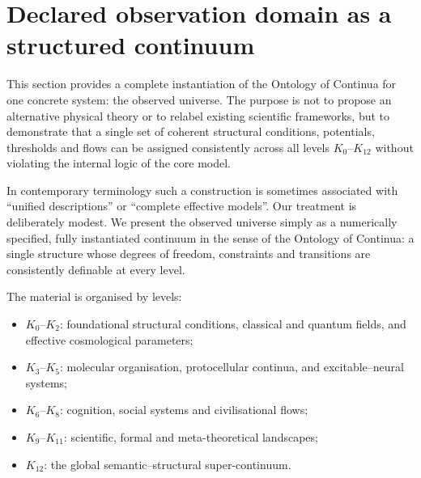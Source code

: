 
\section{Declared observation domain as a structured continuum}
\label{sec:observed-universe-continuum}

This section provides a complete instantiation of the Ontology of Continua
for one concrete system: the observed universe. 
The purpose is not to propose an alternative physical theory or to
relabel existing scientific frameworks, but to demonstrate that a single
set of coherent structural conditions, potentials, thresholds and flows 
can be assigned consistently across all levels \(K_0\)–\(K_{12}\) without
violating the internal logic of the core model.

In contemporary terminology such a construction is sometimes associated 
with ``unified descriptions'' or ``complete effective models''. 
Our treatment is deliberately modest. 
We present the observed universe simply as a numerically specified, 
fully instantiated continuum in the sense of the Ontology of Continua: 
a single structure whose degrees of freedom, constraints and transitions 
are consistently definable at every level.

The material is organised by levels:
\begin{itemize}
    \item \(K_0\)–\(K_2\): foundational structural conditions, classical and 
          quantum fields, and effective cosmological parameters;
    \item \(K_3\)–\(K_5\): molecular organisation, protocellular continua, 
          and excitable–neural systems;
    \item \(K_6\)–\(K_8\): cognition, social systems and civilisational flows;
    \item \(K_9\)–\(K_{11}\): scientific, formal and meta-theoretical 
          landscapes;
    \item \(K_{12}\): the global semantic–structural super-continuum.
\end{itemize}


